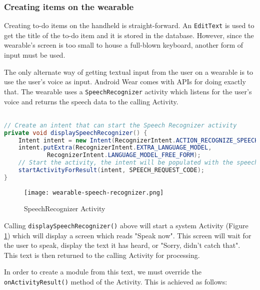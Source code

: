 \subsubsection{Creating items on the wearable}
Creating to-do items on the handheld is straight-forward. An \texttt{EditText}
is used to get the title of the to-do item and it is stored in the database.
However, since the wearable's screen is too small to house a full-blown
keyboard, another form of input must be used.

The only alternate way of getting textual input from the user on a wearable is
to use the user's voice as input. Android Wear comes with APIs for doing exactly
that. The wearable uses a \texttt{SpeechRecognizer} activity which listens for
the user's voice and returns the speech data to the calling Activity.

\begin{lstlisting}[language=Java]

// Create an intent that can start the Speech Recognizer activity
private void displaySpeechRecognizer() {
    Intent intent = new Intent(RecognizerIntent.ACTION_RECOGNIZE_SPEECH);
    intent.putExtra(RecognizerIntent.EXTRA_LANGUAGE_MODEL,
            RecognizerIntent.LANGUAGE_MODEL_FREE_FORM);
    // Start the activity, the intent will be populated with the speech text
    startActivityForResult(intent, SPEECH_REQUEST_CODE);
}

\end{lstlisting}

\begin{figure}
    \centering
    \texttt{[image: wearable-speech-recognizer.png]}
    \caption{SpeechRecognizer Activity}
    \label{fig:speech_recognizer_activity}
\end{figure}

Calling \texttt{displaySpeechRecognizer()} above will start a system Activity
(Figure \ref{fig:speech_recognizer_activity})
which will display a screen which reads "Speak now". This screen will wait for
the user to speak, display the text it has heard, or "Sorry, didn't catch that".
This text is then returned to the calling Activity for processing.

In order to create a module from this text, we must override the
\texttt{onActivityResult()} method of the Activity. This is achieved as
follows:

